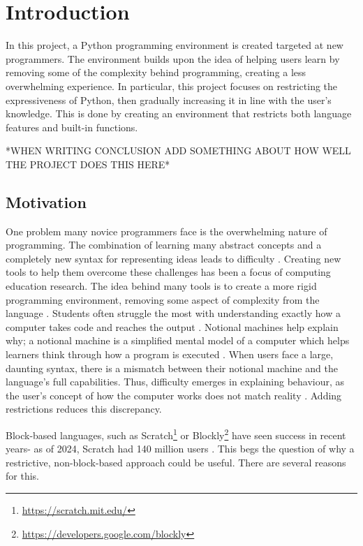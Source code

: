 \chapter{Introduction}

In this project, a Python programming environment is created targeted at new programmers. The environment builds upon the idea of helping users learn by removing some of the complexity behind programming, creating a less overwhelming experience. In particular, this project focuses on restricting the expressiveness of Python, then gradually increasing it in line with the user's knowledge. This is done by creating an environment that restricts both language features and built-in functions.

*WHEN WRITING CONCLUSION ADD SOMETHING ABOUT HOW WELL THE PROJECT DOES THIS HERE*

\section{Motivation}

One problem many novice programmers face is the overwhelming nature of programming. The combination of learning many abstract concepts and a completely new syntax for representing ideas leads to difficulty \cite{green_problems_1980,lahtinen_study_2005}. Creating new tools to help them overcome these challenges has been a focus of computing education research. The idea behind many tools is to create a more rigid programming environment, removing some aspect of complexity from the language \cite{bau_learnable_2017, hermans_hedy_2020, valente_simplifying_2022}.
Students often struggle the most with understanding exactly how a computer takes code and reaches the output \cite{lahtinen_study_2005}. Notional machines help explain why; a notional machine is a simplified mental model of a computer which helps learners think through how a program is executed \cite{sorva_notional_2013}. When users face a large, daunting syntax, there is a mismatch between their notional machine and the language's full capabilities. Thus, difficulty emerges in explaining behaviour, as the user's concept of how the computer works does not match reality \cite{hermans_hedy_2020}.
Adding restrictions reduces this discrepancy.

Block-based languages, such as Scratch\footnote{\href{https://scratch.mit.edu/}{https://scratch.mit.edu/}} or Blockly\footnote{\href{https://developers.google.com/blockly}{https://developers.google.com/blockly}} have seen success in recent years- as of 2024, Scratch had 140 million users \cite{noauthor_2024_2024}. This begs the question of why a restrictive, non-block-based approach could be useful. There are several reasons for this.

